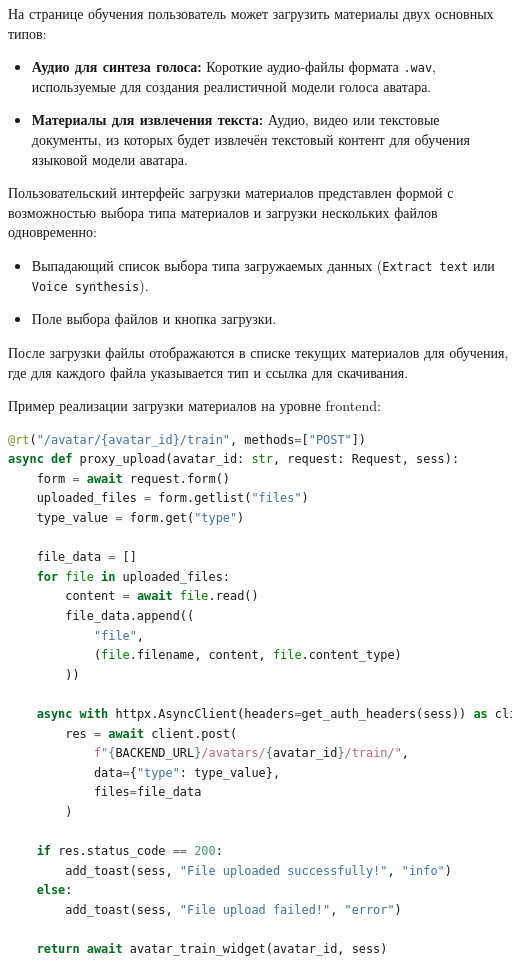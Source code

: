 На странице обучения пользователь может загрузить материалы двух основных типов:
\begin{itemize}
  \item \textbf{Аудио для синтеза голоса:} Короткие аудио-файлы формата \texttt{.wav}, используемые 
        для создания реалистичной модели голоса аватара.
  \item \textbf{Материалы для извлечения текста:} Аудио, видео или текстовые документы, из которых 
        будет извлечён текстовый контент для обучения языковой модели аватара.
\end{itemize}


Пользовательский интерфейс загрузки материалов представлен формой с возможностью выбора типа 
материалов и загрузки нескольких файлов одновременно:

\begin{itemize}
  \item Выпадающий список выбора типа загружаемых данных (\texttt{Extract text} или 
        \texttt{Voice synthesis}).
  \item Поле выбора файлов и кнопка загрузки.
\end{itemize}


После загрузки файлы отображаются в списке текущих материалов для обучения, где для каждого файла 
указывается тип и ссылка для скачивания.


Пример реализации загрузки материалов на уровне frontend:

\begin{lstlisting}[language=Python, numbers=none, frame=none]
@rt("/avatar/{avatar_id}/train", methods=["POST"])
async def proxy_upload(avatar_id: str, request: Request, sess):
    form = await request.form()
    uploaded_files = form.getlist("files")
    type_value = form.get("type")

    file_data = []
    for file in uploaded_files:
        content = await file.read()
        file_data.append((
            "file", 
            (file.filename, content, file.content_type)
        ))

    async with httpx.AsyncClient(headers=get_auth_headers(sess)) as client:
        res = await client.post(
            f"{BACKEND_URL}/avatars/{avatar_id}/train/",
            data={"type": type_value},
            files=file_data
        )

    if res.status_code == 200:
        add_toast(sess, "File uploaded successfully!", "info")
    else:
        add_toast(sess, "File upload failed!", "error")

    return await avatar_train_widget(avatar_id, sess)
\end{lstlisting}



